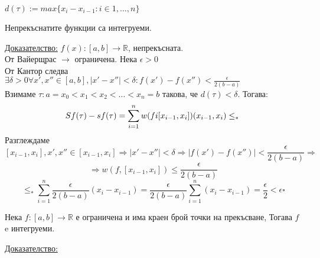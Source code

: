 \documentclass{article}
\newcommand{\tvurdenie}[2]{
    \begin{tcolorbox}[title = #1 ,colframe = blue!70!black, colback = blue!10!white]
        #2
    \end{tcolorbox}
}
\newcommand{\opredelenie}[2]{
    \begin{tcolorbox}[title = #1 ,colframe = red!70!black, colback = red!10!white]
        #2
    \end{tcolorbox}
}
\begin{document}

\opredelenie{Диаметър на $\tau$}{
    $d(\tau):= max\{x_i-x_{i-1} : i \in {1,\dots,n}\}$
}

\tvurdenie{Твъдение}{Непрекъснатите функции са интегруеми.}
\underline{Доказателство:} $f(x): [a,b] \to \mathbb{R}$, непрекъсната. \\
От Вайерщрас $\to$ ограничена. Нека $\epsilon > 0 $ \\
От Кантор следва $\exists \delta >0 \forall x',x'' \in [a,b], |x'-x''|<\delta : f(x')-f(x'') < \frac{\epsilon}{2(b-a)}$ \\
Взимаме $\tau: a=x_0<x_1<x_2<\dots<x_n=b$ такова, че $d(\tau)<\delta$. Тогава: \\
\[Sf(\tau)-sf(\tau)=\sum_{i=1}^{n}w(fi[x_{i-1}, x_i])(x_{i-1}, x_i) \le_{*} \\ \]
Разглеждаме
\[[x_{i-1}, x_i], x', x'' \in [x_{i-1}, x_i] \Rightarrow |x'-x''|<\delta\Rightarrow|f(x')-f(x'')|< \frac{\epsilon}{2(b-a)} \Rightarrow\]
\[\Rightarrow w(f, [x_{i-1}, x_i]) \le \frac{\epsilon}{2(b-a)}\]
\[\le_{*} \sum_{i=1}^{n}\frac{\epsilon}{2(b-a)}(x_i-x_{i-1}) = \frac{\epsilon}{2(b-a)}\sum_{i=1}^{n}(x_i-x_{i-1}) = \frac{\epsilon}{2} < \epsilon \square\]

\tvurdenie{Твърдение}{Нека $f:[a,b] \to \mathbb{R}$ е ограничена и има краен брой точки на прекъсване, Тогава $f$ e интегруеми.}
\underline{Доказателство:}
\end{document}
